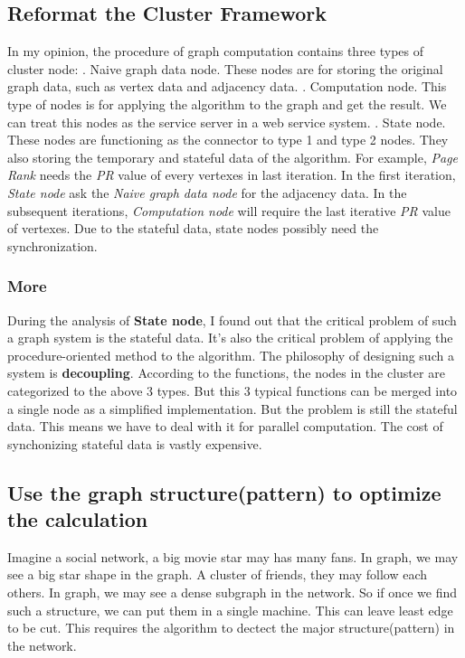 \documentclass{article}
\begin{document}
	\subsection{Reformat the Cluster Framework}
	In my opinion, the procedure of graph computation contains three types of cluster node:
	. Naive graph data node. These nodes are for storing the original graph data, such as vertex data and adjacency data.
	. Computation node. This type of nodes is for applying the algorithm to the graph and get the result. We can treat this nodes as the service server in a web service system.
	. State node. These nodes are functioning as the connector to type 1 and type 2 nodes. They also storing the temporary and stateful data of the algorithm. For example, \emph{Page Rank} needs the \emph{PR} value of every vertexes in last iteration. In the first iteration, \emph{State node} ask the \emph{Naive graph data node} for the adjacency data. In the subsequent iterations, \emph{Computation node} will require the last iterative \emph{PR} value of vertexes. Due to the stateful data, state nodes possibly need the synchronization.
	\newline
	\subsubsection{More}
	During the analysis of \textbf{State node}, I found out that the critical problem of such a graph system is the stateful data. It's also the critical problem of applying the procedure-oriented method to the algorithm. The philosophy of designing such a system is \textbf{decoupling}. According to the functions, the nodes in the cluster are categorized to the above 3 types. But this 3 typical functions can be merged into a single node as a simplified implementation.
	\newline
	But the problem is still the stateful data. This means we have to deal with it for parallel computation. The cost of synchonizing stateful data is vastly expensive.

	\subsection{Use the graph structure(pattern) to optimize the calculation}
	Imagine a social network, a big movie star may has many fans. In graph, we may see a big star shape in the graph. A cluster of friends, they may follow each others. In graph, we may see a dense subgraph in the network. So if once we find such a structure, we can put them in a single machine. This can leave least edge to be cut.
	\newline
	This requires the algorithm to dectect the major structure(pattern) in the network.
\end{document}

